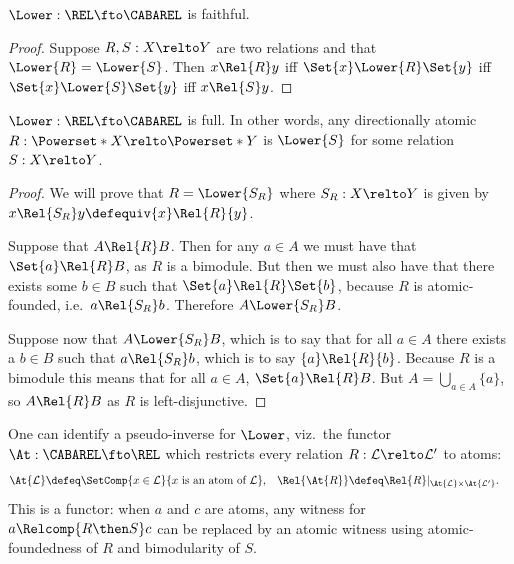 \begin{lemma}\label{lem:lower-faithful}
  \(\Lower : \REL \fto \CABAREL\) is faithful.
\end{lemma}
\begin{proof}
  Suppose \(R, S : X \relto Y\) are two relations and that
  \(\Lower{R} = \Lower{S}\). Then \(x \Rel{R} y\) iff
  \(\Set{x} \Lower{R} \Set{y}\) iff \(\Set{x} \Lower{S} \Set{y}\) iff
  \(x \Rel{S} y\).
\end{proof}

\begin{lemma}\label{lem:cabarel-then-lower}
  \(\Lower : \REL \fto \CABAREL\) is full. In other words, any
  directionally atomic \(R : \Powerset*{X} \relto \Powerset*{Y}\) is
  \(\Lower{S}\) for some relation \(S : X \relto Y \).
\end{lemma}
\begin{proof}
  We will prove that $R = \Lower{S_R}$ where $S_R : X \relto Y$ is given by \(x
  \Rel{S_R} y \defequiv \{ x \} \Rel{R} \{ y \}\).

  Suppose that \(A \Rel{R} B\). Then for any \(a \in A\) we must have that
  \(\Set{a} \Rel{R} B\), as \(R\) is a bimodule. But then we must also have that
  there exists some \(b \in B\) such that \(\Set{a} \Rel{R} \Set{b}\), because
  \(R\) is atomic-founded, i.e.\ $a \Rel{S_R} b$. Therefore \(A \Lower{S_R} B\).

  Suppose now that \(A \Lower{S_R} B\), which is to say that for all $a \in A$ there
  exists a $b \in B$ such that $a \Rel{S_R} b$, which is to say $\{a\} \Rel{R}
  \{b\}$. Because \(R\) is a bimodule this means that for all \(a \in A\),
  \(\Set{a} \Rel{R} B\). But $A = \bigcup_{a \in A} \{ a \}$, so \(A \Rel{R}
  B\) as \(R\) is left-disjunctive.
\end{proof}

One can identify a pseudo-inverse for \(\Lower\), viz.\ the functor \(\At :
\CABAREL \fto \REL\) which restricts every relation \(R : \mathcal{L} \relto
\mathcal{L}'\) to atoms:
\begin{align*}
  \At{\mathcal{L}} &\defeq \SetComp{x \in \mathcal{L}}{x \text{ is an atom of }
                     \mathcal{L}},
  &
    \Rel{\At{R}} &\defeq \Rel{R}|_{\At{\mathcal{L}} \times \At{\mathcal{L}'}}.
\end{align*}
This is a functor: when \(a\) and \(c\) are atoms, any witness for
\(a \Relcomp{R \then S} c\) can be replaced by an atomic witness using
atomic-foundedness of \(R\) and bimodularity of \(S\).

